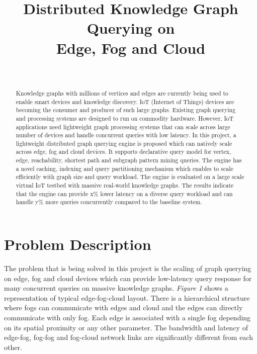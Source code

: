 \documentclass[conference]{IEEEtran}
\begin{document}
\title{Distributed Knowledge Graph Querying on \\ Edge, Fog and Cloud}


\author{\\
}


\maketitle


\begin{abstract}
Knowledge graphs with millions of vertices and edges are currently being used to enable smart devices and knowledge discovery. IoT (Internet of Things) devices are becoming the consumer and producer of such large graphs. Existing graph querying and processing systems are designed to run on commodity hardware. However, IoT applications need lightweight graph processing systems that can scale across large number of devices and  handle concurrent queries with low latency. In this project, a lightweight distributed graph querying engine is proposed which can natively scale across edge, fog and cloud devices. It supports declarative query model for vertex, edge, reachability, shortest path and subgraph pattern mining queries. The engine has a novel caching, indexing and query partitioning mechanism which enables to scale efficiently with graph size and query workload. The engine is evaluated on a large scale virtual IoT testbed with massive real-world knowledge graphs. The results indicate that the engine can provide x\% lower latency on a diverse query workload and can handle y\% more queries concurrently compared to the baseline system.
\end{abstract}

\section{Problem Description}
The problem that is being solved in this project is the scaling of graph querying on edge, fog and cloud devices which can provide low-latency query response for many concurrent queries on massive knowledge graphs. \emph{Figure 1} shows a representation of typical edge-fog-cloud layout. There is a hierarchical structure where fogs can communicate with edges and cloud and the edges can directly communicate with only fog. Each edge is associated with a single fog depending on its spatial proximity or any other parameter. The bandwidth and latency of edge-fog, fog-fog and fog-cloud network links are significantly different from each other.
\end{document}
